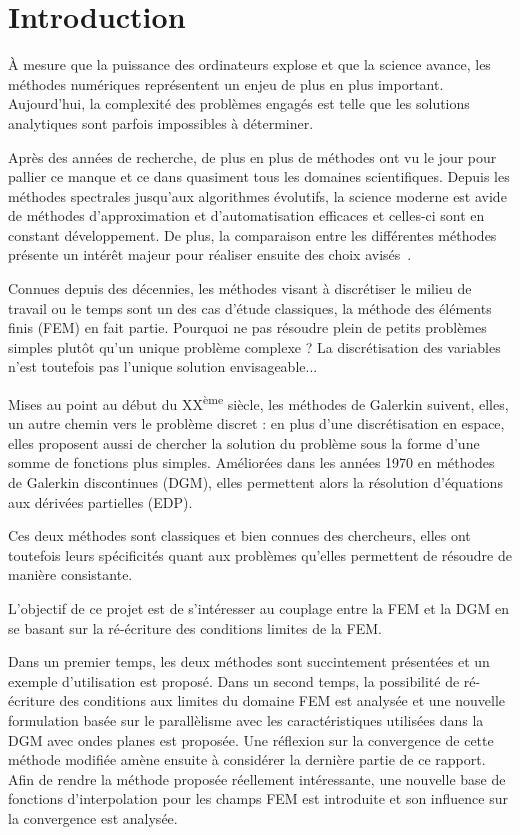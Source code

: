 \section*{Introduction}

À mesure que la puissance des ordinateurs explose et que la science avance, les méthodes numériques représentent un
enjeu de plus en plus important. Aujourd'hui, la complexité des problèmes engagés est telle que les solutions
analytiques sont parfois impossibles à déterminer.

Après des années de recherche, de plus en plus de méthodes ont vu le jour pour pallier ce manque et ce dans quasiment
tous les domaines scientifiques. Depuis les méthodes spectrales jusqu'aux algorithmes évolutifs, la science moderne est
avide de méthodes d'approximation et d'automatisation efficaces et celles-ci sont en constant développement. De plus,
la comparaison entre les différentes méthodes présente un intérêt majeur pour réaliser ensuite des choix
avisés~\cite{Gabard11}.

Connues depuis des décennies, les méthodes visant à discrétiser le milieu de travail ou le temps sont un des cas
d'étude classiques, la méthode des éléments finis (FEM) en fait partie. Pourquoi ne pas résoudre plein de petits problèmes
simples plutôt qu'un unique problème complexe ? La discrétisation des variables n'est toutefois pas l'unique solution
envisageable...

Mises au point au début du XX\textsuperscript{ème} siècle, les méthodes de Galerkin suivent, elles, un autre chemin vers le
problème discret : en plus d'une discrétisation en espace, elles proposent aussi de chercher la solution du problème
sous la forme d'une somme de fonctions plus simples. Améliorées dans les années 1970 en méthodes de Galerkin
discontinues (DGM), elles permettent alors la résolution d'équations aux dérivées partielles (EDP).

Ces deux méthodes sont classiques et bien connues des chercheurs, elles ont toutefois leurs spécificités quant aux
problèmes qu'elles permettent de résoudre de manière consistante.

\bigskip

L'objectif de ce projet est de s'intéresser au couplage entre la FEM et la DGM en se basant sur la ré-écriture des
conditions limites de la FEM.

Dans un premier temps, les deux méthodes sont succintement présentées et un exemple d'utilisation est proposé.
Dans un second temps, la possibilité de ré-écriture des conditions aux limites du domaine FEM est analysée et une
nouvelle formulation basée sur le parallèlisme avec les caractéristiques utilisées dans la DGM avec ondes planes est
proposée. Une réflexion sur la convergence de cette méthode modifiée amène ensuite à considérer la dernière partie de ce
rapport. Afin de rendre la méthode proposée réellement intéressante, une nouvelle base de fonctions d'interpolation pour
les champs FEM est introduite et son influence sur la convergence est analysée.



